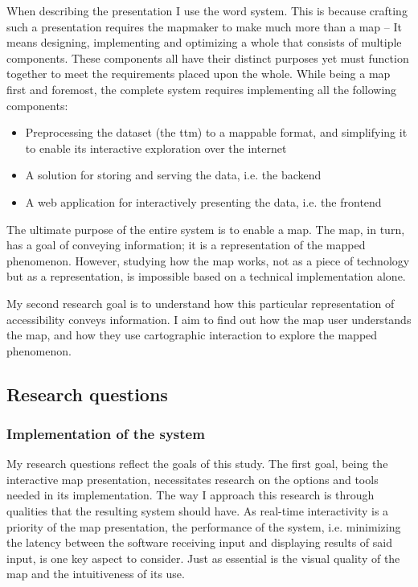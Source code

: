 When describing the presentation I use the word system.
This is because crafting such a presentation
requires the mapmaker to make much more than a map --
It means designing, implementing and optimizing
a whole that consists of multiple components.
These components all have their distinct purposes yet must function together
to meet the requirements placed upon the whole.
While being a map first and foremost, the complete system
requires implementing all the following components:
\begin{itemize}
	\item Preprocessing the dataset (the \acrshort{ttm}) to a mappable format,
	and simplifying it to enable its interactive exploration over the internet
	\item A solution for storing and serving the data, i.e. the backend
	\item A web application for interactively presenting the data, i.e. the frontend
\end{itemize}

The ultimate purpose of the entire system is to enable a map.
The map, in turn, has a goal of conveying information;
it is a representation of the mapped phenomenon.
However, studying how the map works,
not as a piece of technology but as a representation,
is impossible based on a technical implementation alone.

My second research goal is to understand how
this particular representation of accessibility conveys information.
I aim to find out how the map user understands the map,
and how they use cartographic interaction to explore the mapped phenomenon.


\subsection{Research questions}

\subsubsection{Implementation of the system}

My research questions reflect the goals of this study.  %
The first goal, being the interactive map presentation,
necessitates research on the options and tools
needed in its implementation.
The way I approach this research is through qualities
that the resulting system should have.
As real-time interactivity is a priority of the map presentation,
the performance of the system,
i.e. minimizing the latency between
the software receiving input and displaying results of said input,
is one key aspect to consider.
Just as essential is the visual quality of the map
and the intuitiveness of its use.

